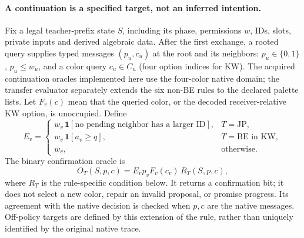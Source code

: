 \paragraph{A continuation is a specified target, not an inferred intention.}
Fix a legal teacher-prefix state $S$, including its phase, permissions $w$,
IDs, slots, private inputs and derived algebraic data. After the first
exchange, a rooted query supplies typed messages $(p_u,c_u)$ at the root and
its neighbors: $p_u\in\{0,1\}$, $p_u\le w_u$, and a color query $c_u\in C_u$
(four option indices for KW). The acquired continuation oracles implemented
here use the four-color native domain; the transfer evaluator separately
extends the six non-BE rules to the declared palette lists. Let $F_v(c)$ mean that the queried color, or the decoded
receiver-relative KW option, is unoccupied. Define
\[
 E_v=\begin{cases}
 w_v\,\mathbf1[\text{no pending neighbor has a larger ID}],&T=\mathrm{JP},\\
 w_v\,\mathbf1[a_v\ge q],&T=\mathrm{BE}\text{ in KW},\\
 w_v,&\text{otherwise}.
 \end{cases}
\]
The binary confirmation oracle is
\begin{equation}\label{eq:oracle}
 O_T(S,p,c)=E_v p_v F_v(c_v)\,R_T(S,p,c),
\end{equation}
where $R_T$ is the rule-specific condition below. It returns a confirmation
bit; it does not select a new color, repair an invalid proposal, or promise
progress. Its agreement with the native decision is checked when $p,c$ are
the native messages. Off-policy targets are defined by this extension of the
rule, rather than uniquely identified by the original native trace.

